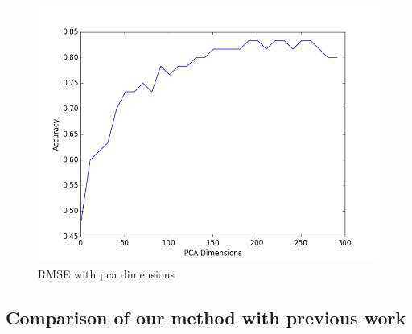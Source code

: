 \documentclass{article} %
\begin{document}
\begin{figure}[h]
\begin{center}
\includegraphics[scale=0.5]{accuracy_2of2.png}
\end{center}
\caption{RMSE with pca dimensions}
\end{figure}




\subsection{Comparison of our method with previous work}




\end{document}
